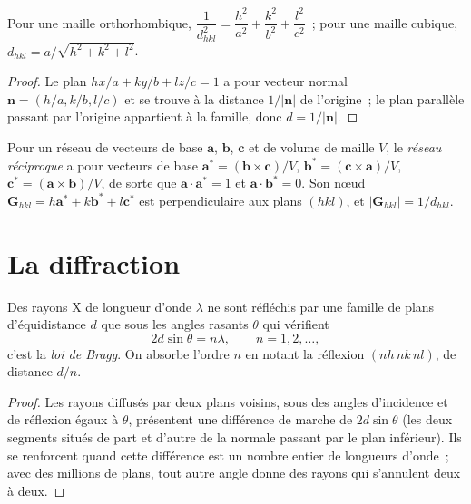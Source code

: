 \begin{proposition}\label{prop:b3:x-ray-diffraction:spacing}
Pour une maille orthorhombique, $\dfrac{1}{d_{hkl}^2} = \dfrac{h^2}{a^2} + \dfrac{k^2}{b^2} +
\dfrac{l^2}{c^2}$~; pour une maille cubique, $d_{hkl} = a/\sqrt{h^2 + k^2 + l^2}$.
\end{proposition}

\begin{proof}
Le plan $hx/a + ky/b + lz/c = 1$ a pour vecteur normal $\mathbf n = (h/a, k/b, l/c)$
et se trouve à la distance $1/|\mathbf n|$ de l'origine~; le plan
parallèle passant par l'origine appartient à la famille, donc
$d = 1/|\mathbf n|$.
\end{proof}

\begin{definition}\label{def:b3:x-ray-diffraction:reciprocal}
Pour un réseau de vecteurs de base $\mathbf a$, $\mathbf b$, $\mathbf c$ et
de volume de maille $V$,
le \emph{réseau réciproque} a pour vecteurs de base
$\mathbf a^* = (\mathbf b\times\mathbf c)/V$, $\mathbf b^* = (\mathbf c\times\mathbf a)/V$,
$\mathbf c^* = (\mathbf a\times\mathbf b)/V$, de sorte que $\mathbf a\cdot\mathbf a^* = 1$ et
$\mathbf a\cdot\mathbf b^* = 0$. Son nœud $\mathbf G_{hkl} = h\mathbf a^* + k\mathbf b^* + l\mathbf c^*$
est perpendiculaire aux plans $(hkl)$, et $|\mathbf G_{hkl}| = 1/d_{hkl}$.
\end{definition}

\section{La diffraction}

\begin{theorem}\label{thm:b3:x-ray-diffraction:bragg}
Des rayons X de longueur d'onde $\lambda$ ne sont réfléchis par une
famille de plans d'équidistance $d$ que sous les angles rasants $\theta$
qui vérifient
\[
2d\sin\theta = n\lambda, \qquad n = 1, 2, \dots,
\]
c'est la \emph{loi de Bragg}. On absorbe l'ordre $n$
en notant la réflexion $(nh\,nk\,nl)$, de distance $d/n$.
\end{theorem}

\begin{proof}
Les rayons diffusés par deux plans voisins, sous des angles d'incidence
et de réflexion égaux à $\theta$, présentent une différence de marche de
$2d\sin\theta$ (les deux segments situés de part et d'autre de la
normale passant par le plan inférieur). Ils se renforcent quand cette
différence est un nombre entier de longueurs d'onde~; avec des millions
de plans, tout autre angle donne des rayons qui s'annulent deux à deux.
\end{proof}

